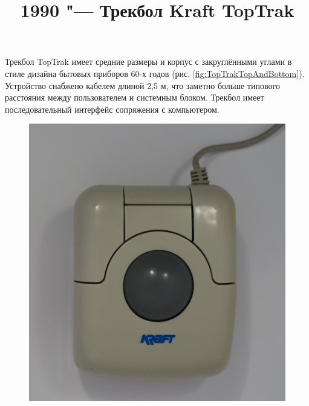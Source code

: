 \documentclass[11pt, a4paper]{article}
\begin{document}
\title{1990 "--- Трекбол Kraft TopTrak}
\date{}
\maketitle

Трекбол TopTrak имеет средние размеры и корпус с закруглёнными углами в стиле дизайна бытовых приборов 60-х годов (рис. \ref{fig:TopTrakTopAndBottom}). Устройство снабжено кабелем длиной 2,5 м, что заметно больше типового расстояния между пользователем и системным блоком. Трекбол имеет последовательный интерфейс сопряжения с компьютером.

\begin{figure}[h]
    \centering
    \includegraphics[scale=0.5]{1990_kraft_toptrack/2.9.jpg}

\end{figure}
\end{document}
